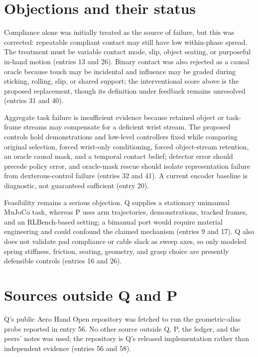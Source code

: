 \documentclass{article}
\begin{document}
\section{Objections and their status}
Compliance alone was initially treated as the source of failure, but this was corrected: repeatable compliant contact may still have low within-phase spread. The treatment must be variable contact mode, slip, object seating, or purposeful in-hand motion (entries 13 and 26). Binary contact was also rejected as a causal oracle because touch may be incidental and influence may be graded during sticking, rolling, slip, or shared support; the interventional score above is the proposed replacement, though its definition under feedback remains unresolved (entries 31 and 40).

Aggregate task failure is insufficient evidence because retained object or task-frame streams may compensate for a deficient wrist stream. The proposed controls hold demonstrations and low-level controllers fixed while comparing original selection, forced wrist-only conditioning, forced object-stream retention, an oracle causal mask, and a temporal contact belief; detector error should precede policy error, and oracle-mask rescue should isolate representation failure from dexterous-control failure (entries 32 and 41). A current encoder baseline is diagnostic, not guaranteed sufficient (entry 20).

Feasibility remains a serious objection. Q supplies a stationary unimanual MuJoCo task, whereas P uses arm trajectories, demonstrations, tracked frames, and an RLBench-based setting; a bimanual port would require material engineering and could confound the claimed mechanism (entries 9 and 17). Q also does not validate pad compliance or cable slack as sweep axes, so only modeled spring stiffness, friction, seating, geometry, and grasp choice are presently defensible controls (entries 16 and 26).

\section{Sources outside Q and P}
Q's public Aero Hand Open repository was fetched to run the geometric-alias probe reported in entry 56. No other source outside Q, P, the ledger, and the peers' notes was used; the repository is Q's released implementation rather than independent evidence (entries 56 and 58).
\end{document}
